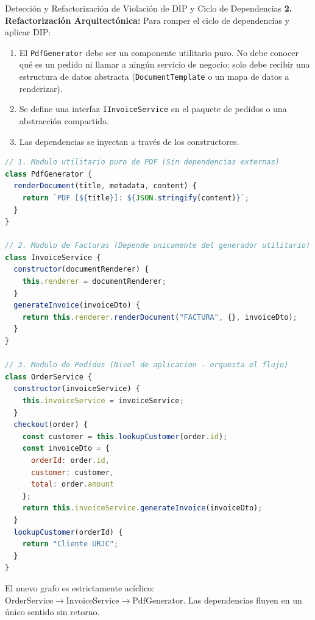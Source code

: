 \begin{ejercicioresuelto}{Detección y Refactorización de Violación de DIP y Ciclo de Dependencias}
\textbf{2. Refactorización Arquitectónica:}
Para romper el ciclo de dependencias y aplicar DIP:
\begin{enumerate}[leftmargin=1.5em]
  \item El \texttt{PdfGenerator} debe ser un componente utilitario puro. No debe conocer qué es un pedido ni llamar a ningún servicio de negocio; solo debe recibir una estructura de datos abstracta (\texttt{DocumentTemplate} o un mapa de datos a renderizar).
  \item Se define una interfaz \texttt{IInvoiceService} en el paquete de pedidos o una abstracción compartida.
  \item Las dependencias se inyectan a través de los constructores.
\end{enumerate}

\begin{lstlisting}[language=javascript, caption={Código refactorizado limpio y sin ciclos}]
// 1. Modulo utilitario puro de PDF (Sin dependencias externas)
class PdfGenerator {
  renderDocument(title, metadata, content) {
    return `PDF [${title}]: ${JSON.stringify(content)}`;
  }
}

// 2. Modulo de Facturas (Depende unicamente del generador utilitario)
class InvoiceService {
  constructor(documentRenderer) {
    this.renderer = documentRenderer;
  }
  generateInvoice(invoiceDto) {
    return this.renderer.renderDocument("FACTURA", {}, invoiceDto);
  }
}

// 3. Modulo de Pedidos (Nivel de aplicacion - orquesta el flujo)
class OrderService {
  constructor(invoiceService) {
    this.invoiceService = invoiceService;
  }
  checkout(order) {
    const customer = this.lookupCustomer(order.id);
    const invoiceDto = {
      orderId: order.id,
      customer: customer,
      total: order.amount
    };
    return this.invoiceService.generateInvoice(invoiceDto);
  }
  lookupCustomer(orderId) {
    return "Cliente URJC";
  }
}
\end{lstlisting}
El nuevo grafo es estrictamente acíclico: $\text{OrderService} \longrightarrow \text{InvoiceService} \longrightarrow \text{PdfGenerator}$. Las dependencias fluyen en un único sentido sin retorno.
\end{ejercicioresuelto}

